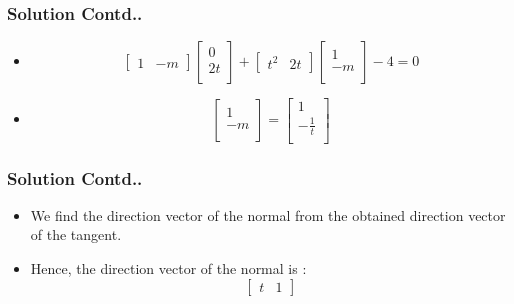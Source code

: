 \documentclass[12pt]{beamer}
\begin{document}
\begin{frame}
\frametitle{Solution Contd..}
\begin{itemize}
\item<1-2>
\[
\begin{bmatrix}
    1 & -m  
\end{bmatrix}
\begin{bmatrix}
    0\\
    2t\\  
\end{bmatrix} + 
\begin{bmatrix}
    t^2 & 2t  
\end{bmatrix}
\begin{bmatrix}
    1\\
    -m\\  
\end{bmatrix} - 4 = 0
\]
\item<2>
\[
\begin{bmatrix}
    1\\
    -m\\  
\end{bmatrix} =
\begin{bmatrix}
    1\\
    -\frac{1}{t}\\  
\end{bmatrix}
\]
\end{itemize}
\end{frame}



\begin{frame}
\frametitle{Solution Contd..}
\begin{itemize}
\item<1-2> We find the direction vector of the normal from the obtained direction vector of the tangent.
\item<2> Hence, the direction vector of the normal is : 
\[
\begin{bmatrix}
    t & 1
\end{bmatrix}
\]
\end{itemize}
\end{frame}

\end{document}
